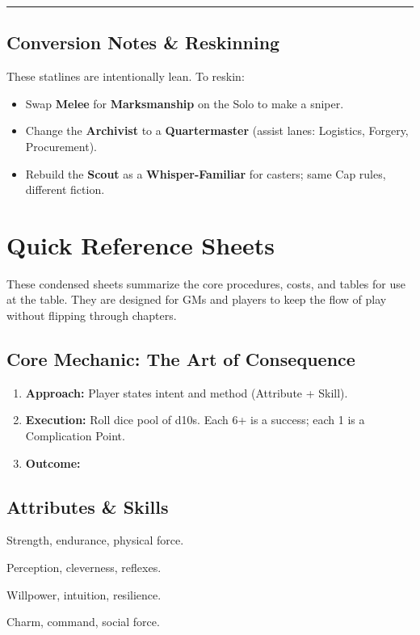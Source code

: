 \documentclass[12pt]{book}
\begin{document}
\bigskip
\hrule
\bigskip

\section{Conversion Notes \& Reskinning}
These statlines are intentionally lean. To reskin:
\begin{itemize}
  \item Swap \textbf{Melee} for \textbf{Marksmanship} on the Solo to make a sniper.
  \item Change the \textbf{Archivist} to a \textbf{Quartermaster} (assist lanes: Logistics, Forgery, Procurement).
  \item Rebuild the \textbf{Scout} as a \textbf{Whisper-Familiar} for casters; same Cap rules, different fiction.
\end{itemize}

\chapter{Quick Reference Sheets}

These condensed sheets summarize the core procedures, costs, and tables for use at the table.  
They are designed for GMs and players to keep the flow of play without flipping through chapters.

\section*{Core Mechanic: The Art of Consequence}
\begin{enumerate}
  \item \textbf{Approach:} Player states intent and method (Attribute + Skill).
  \item \textbf{Execution:} Roll dice pool of d10s. Each 6+ is a success; each 1 is a Complication Point.
  \item \textbf{Outcome:}  
\end{enumerate}

\section*{Attributes \& Skills}
\begin{description}[leftmargin=2cm]
  \item[Body] Strength, endurance, physical force.  
  \item[Wits] Perception, cleverness, reflexes.  
  \item[Spirit] Willpower, intuition, resilience.  
  \item[Presence] Charm, command, social force.  
\end{description}
\end{document}
